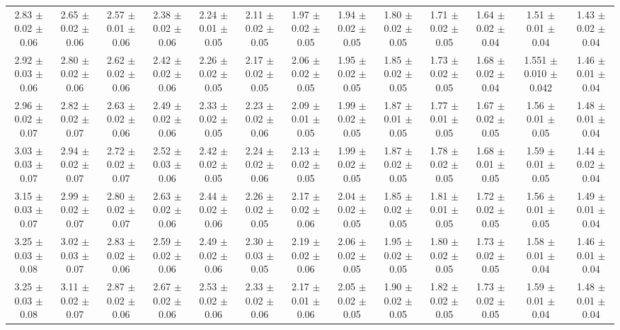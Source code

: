 \begin{landscape}
{\begin{tabular}{  | c | c | c | c | c | c | c | c | c | c | c | c | c | }
2.83 $\pm$0.02 $\pm$0.06 & 2.65 $\pm$0.02 $\pm$0.06 & 2.57 $\pm$0.01 $\pm$0.06 & 2.38 $\pm$0.02 $\pm$0.06 & 2.24 $\pm$0.01 $\pm$0.05 & 2.11 $\pm$0.02 $\pm$0.05 & 1.97 $\pm$0.02 $\pm$0.05 & 1.94 $\pm$0.02 $\pm$0.05 & 1.80 $\pm$0.02 $\pm$0.05 & 1.71 $\pm$0.02 $\pm$0.05 & 1.64 $\pm$0.02 $\pm$0.04 & 1.51 $\pm$0.01 $\pm$0.04 & 1.43 $\pm$0.02 $\pm$0.04\\
2.92 $\pm$0.03 $\pm$0.06 & 2.80 $\pm$0.02 $\pm$0.06 & 2.62 $\pm$0.02 $\pm$0.06 & 2.42 $\pm$0.02 $\pm$0.06 & 2.26 $\pm$0.02 $\pm$0.05 & 2.17 $\pm$0.02 $\pm$0.05 & 2.06 $\pm$0.02 $\pm$0.05 & 1.95 $\pm$0.02 $\pm$0.05 & 1.85 $\pm$0.02 $\pm$0.05 & 1.73 $\pm$0.02 $\pm$0.05 & 1.68 $\pm$0.02 $\pm$0.04 & 1.551 $\pm$0.010 $\pm$0.042 & 1.46 $\pm$0.01 $\pm$0.04\\
2.96 $\pm$0.02 $\pm$0.07 & 2.82 $\pm$0.02 $\pm$0.07 & 2.63 $\pm$0.02 $\pm$0.06 & 2.49 $\pm$0.02 $\pm$0.06 & 2.33 $\pm$0.02 $\pm$0.05 & 2.23 $\pm$0.02 $\pm$0.06 & 2.09 $\pm$0.01 $\pm$0.05 & 1.99 $\pm$0.02 $\pm$0.05 & 1.87 $\pm$0.01 $\pm$0.05 & 1.77 $\pm$0.01 $\pm$0.05 & 1.67 $\pm$0.02 $\pm$0.05 & 1.56 $\pm$0.01 $\pm$0.05 & 1.48 $\pm$0.01 $\pm$0.04\\
3.03 $\pm$0.03 $\pm$0.07 & 2.94 $\pm$0.02 $\pm$0.07 & 2.72 $\pm$0.02 $\pm$0.07 & 2.52 $\pm$0.03 $\pm$0.06 & 2.42 $\pm$0.02 $\pm$0.05 & 2.24 $\pm$0.02 $\pm$0.06 & 2.13 $\pm$0.02 $\pm$0.05 & 1.99 $\pm$0.02 $\pm$0.05 & 1.87 $\pm$0.02 $\pm$0.05 & 1.78 $\pm$0.02 $\pm$0.05 & 1.68 $\pm$0.01 $\pm$0.05 & 1.59 $\pm$0.01 $\pm$0.05 & 1.44 $\pm$0.02 $\pm$0.04\\
3.15 $\pm$0.03 $\pm$0.07 & 2.99 $\pm$0.02 $\pm$0.07 & 2.80 $\pm$0.02 $\pm$0.07 & 2.63 $\pm$0.02 $\pm$0.06 & 2.44 $\pm$0.02 $\pm$0.06 & 2.26 $\pm$0.02 $\pm$0.05 & 2.17 $\pm$0.02 $\pm$0.06 & 2.04 $\pm$0.02 $\pm$0.05 & 1.85 $\pm$0.02 $\pm$0.05 & 1.81 $\pm$0.01 $\pm$0.05 & 1.72 $\pm$0.02 $\pm$0.05 & 1.56 $\pm$0.01 $\pm$0.05 & 1.49 $\pm$0.01 $\pm$0.04\\
3.25 $\pm$0.03 $\pm$0.08 & 3.02 $\pm$0.03 $\pm$0.07 & 2.83 $\pm$0.02 $\pm$0.06 & 2.59 $\pm$0.02 $\pm$0.06 & 2.49 $\pm$0.02 $\pm$0.06 & 2.30 $\pm$0.03 $\pm$0.05 & 2.19 $\pm$0.02 $\pm$0.06 & 2.06 $\pm$0.02 $\pm$0.05 & 1.95 $\pm$0.02 $\pm$0.05 & 1.80 $\pm$0.02 $\pm$0.05 & 1.73 $\pm$0.02 $\pm$0.05 & 1.58 $\pm$0.01 $\pm$0.04 & 1.46 $\pm$0.01 $\pm$0.04\\
3.25 $\pm$0.03 $\pm$0.08 & 3.11 $\pm$0.02 $\pm$0.07 & 2.87 $\pm$0.02 $\pm$0.06 & 2.67 $\pm$0.02 $\pm$0.06 & 2.53 $\pm$0.02 $\pm$0.06 & 2.33 $\pm$0.02 $\pm$0.06 & 2.17 $\pm$0.01 $\pm$0.06 & 2.05 $\pm$0.02 $\pm$0.05 & 1.90 $\pm$0.02 $\pm$0.05 & 1.82 $\pm$0.02 $\pm$0.05 & 1.73 $\pm$0.02 $\pm$0.05 & 1.59 $\pm$0.01 $\pm$0.04 & 1.48 $\pm$0.01 $\pm$0.04\\

\end{tabular}}
\end{landscape}

